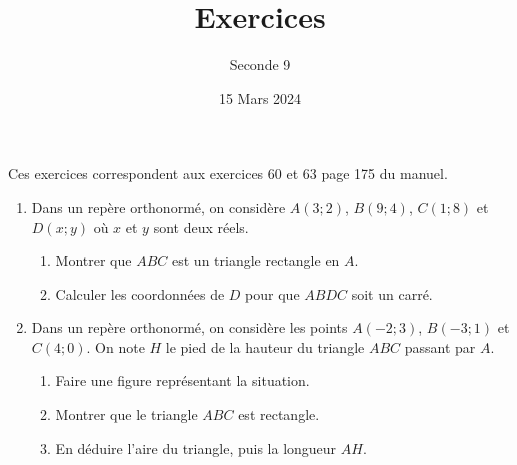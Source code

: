\documentclass{article}
\title{Exercices}
\author{Seconde 9}
\date{15 Mars 2024}
\begin{document}
\maketitle
Ces exercices correspondent aux exercices 60 et 63 page 175 du manuel.
\begin{enumerate}[label=\textbf{Exercice \arabic* : }]
\item Dans un repère orthonormé, on considère $A(3;2)$, $B(9;4)$, $C(1;8)$ et $D(x;y)$ où $x$ et $y$ sont deux réels.
\begin{enumerate}
\item Montrer que $ABC$ est un triangle rectangle en $A$.
\item Calculer les coordonnées de $D$ pour que $ABDC$ soit un carré. 
\end{enumerate}
\item Dans un repère orthonormé, on considère les points $A(-2;3)$, $B(-3;1)$ et $C(4;0)$. On note $H$ le pied de la hauteur du triangle $ABC$ passant par $A$.
\begin{enumerate}
\item Faire une figure représentant la situation.
\item Montrer que le triangle $ABC$ est rectangle.
\item En déduire l'aire du triangle, puis la longueur $AH$.
\end{enumerate}
\end{enumerate}
\end{document}
